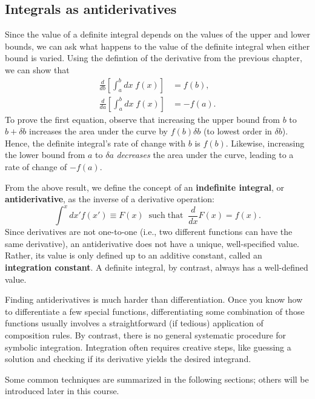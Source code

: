 \documentclass[10pt,a4paper]{article}
\begin{document}
\subsection{Integrals as antiderivatives}
\label{integrals-as-antiderivatives}

Since the value of a definite integral depends on the values of the
upper and lower bounds, we can ask what happens to the value of the
definite integral when either bound is varied. Using the defintion of
the derivative from the previous chapter, we can show that
\begin{align}
  \frac{d}{db} \left[\int_a^b dx\; f(x)\right] &= f(b), \\
  \frac{d}{da} \left[\int_a^b dx\; f(x)\right] &= -f(a).
\end{align}
To prove the first equation, observe that increasing the upper bound
from $b$ to $b + \delta b$ increases the area under the curve by $f(b)
\delta b$ (to lowest order in $\delta b$). Hence, the definite
integral's rate of change with $b$ is $f(b)$. Likewise, increasing the
lower bound from $a$ to $\delta a$ \emph{decreases} the area under the
curve, leading to a rate of change of $-f(a)$.

From the above result, we define the concept of an \textbf{indefinite
integral}, or \textbf{antiderivative}, as the inverse of a derivative
operation:
\begin{equation}
\int^x dx' f(x') \equiv F(x) \;\;\mathrm{such}\;\mathrm{that}\;\; \frac{d}{dx}F(x) = f(x).
\end{equation}
Since derivatives are not one-to-one (i.e., two different functions can
have the same derivative), an antiderivative does not have a unique,
well-specified value. Rather, its value is only defined up to an
additive constant, called an \textbf{integration constant}. A definite
integral, by contrast, always has a well-defined value.

Finding antiderivatives is much harder than differentiation. Once you
know how to differentiate a few special functions, differentiating
some combination of those functions usually involves a straightforward
(if tedious) application of composition rules. By contrast, there is
no general systematic procedure for symbolic integration. Integration
often requires creative steps, like guessing a solution and checking
if its derivative yields the desired integrand.

Some common techniques are summarized in the following sections;
others will be introduced later in this course.
\end{document}
